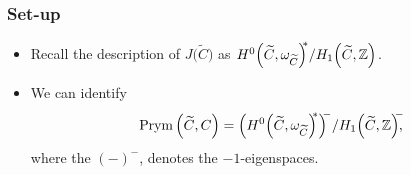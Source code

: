 \begin{frame}
\frametitle{Set-up}

\begin{itemize}
	\item Recall the description of $J\Big(\widetilde C\Big)$ as $H^0\Big(\widetilde C, \omega_{\widetilde C}\Big)^{\mkern-7mu\ast}/H_1\Big(\widetilde C, \mathbb{Z}\Big)$.
	\item We can identify
	\alert{
	\[
	\operatorname{Prym}\Big(\widetilde C, C\Big) = \Big(H^0\Big(\widetilde C, \omega_{\widetilde C}\Big)^{\mkern-7mu\ast}\Big)^{\mkern-7mu-} / {H_1\Big(\widetilde C, \mathbb{Z}\Big)}^{\mkern-7mu-}\mkern-7mu,
	\]
	}
	where the $(-)^-$, denotes the $-1$-eigenspaces.
\end{itemize}



\end{frame}


    \begin{frame}[plain]
     \end{frame}

